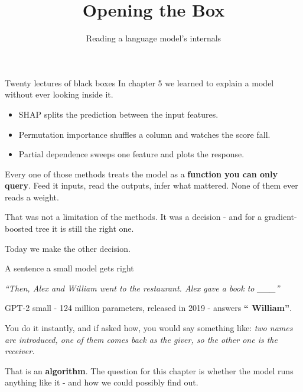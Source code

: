 \documentclass[aspectratio=169]{beamer}
\title{Opening the Box}
\subtitle{Reading a language model's internals}
\author{}
\date{}
\newcommand{\keybox}[1]{%
  \begin{tcolorbox}[colback=armblue!8, colframe=armblue, boxrule=0.6pt, arc=2pt]
  #1
  \end{tcolorbox}}
\newcommand{\promptbox}[1]{%
  \begin{center}
  \begin{tcolorbox}[colback=lightbg, colframe=gray, boxrule=0.5pt, arc=2pt, width=0.88\textwidth]
    \centering\textit{#1}
  \end{tcolorbox}
  \end{center}}
\begin{document}
\begin{frame}[plain]
  \titlepage
\end{frame}

\begin{frame}{Twenty lectures of black boxes}
  \vspace{0.5em}
  In chapter 5 we learned to explain a model without ever looking inside it.

  \vspace{0.8em}
  \begin{itemize}
    \item SHAP splits the prediction between the input features.
    \item Permutation importance shuffles a column and watches the score fall.
    \item Partial dependence sweeps one feature and plots the response.
  \end{itemize}

  \vspace{0.9em}
  \keybox{Every one of those methods treats the model as a \textbf{function you can only query}.
  Feed it inputs, read the outputs, infer what mattered. None of them ever reads a weight.}

  \vspace{0.7em}
  That was not a limitation of the methods. It was a decision - and for a gradient-boosted tree
  it is still the right one.

  \vspace{0.5em}
  Today we make the other decision.
\end{frame}

\begin{frame}{A sentence a small model gets right}
  \promptbox{``Then, Alex and William went to the restaurant. Alex gave a book to \_\_\_''}

  \vspace{0.3em}
  GPT-2 small - 124 million parameters, released in 2019 - answers \textbf{`` William''}.

  \vspace{0.9em}
  You do it instantly, and if asked how, you would say something like: \emph{two names are
  introduced, one of them comes back as the giver, so the other one is the receiver.}

  \vspace{0.9em}
  \keybox{That is an \textbf{algorithm}. The question for this chapter is whether the model
  runs anything like it - and how we could possibly find out.}
\end{frame}
\end{document}
